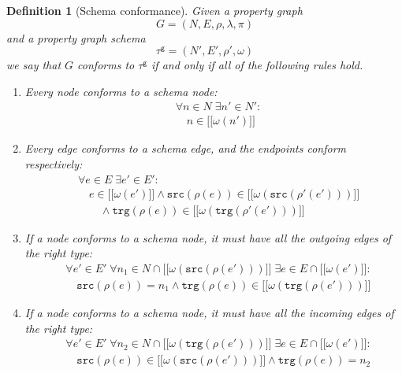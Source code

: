 \documentclass{article}
\newtheorem{definition}[theorem]{Definition}
\newcommand{\src}{\mathtt{src}}
\newcommand{\trg}{\mathtt{trg}}
\newcommand{\gtype}{\tau^\mathsf{g}}
\newcommand{\lsem}{\ensuremath{[\![}}
\newcommand{\rsem}{\ensuremath{]\!]}}
\newcommand{\sem}[1]{\ensuremath{\lsem #1 \rsem}}
\begin{document}
\begin{definition}[Schema conformance]
  Given a property graph $$G = (N, E, \rho, \lambda, \pi)$$ and a property graph schema $$\gtype = (N', E', \rho', \omega)$$ we say that $G$ \emph{conforms} to $\gtype$ if and only if all of the following rules hold.

  \begin{enumerate}
    \item\label{rule:conformance-node}
    Every node conforms to a schema node:
    \begin{align*}
      &\forall n \in N \; \exists n' \in N' :\\
      &\quad n \in \sem{\omega(n')}
    \end{align*}
    
    \item\label{rule:conformance-edge}
    Every edge conforms to a schema edge, and the endpoints conform respectively:
    \begin{align*}
      &\forall e \in E \; \exists e' \in E' :\\
      &\quad e \in \sem{\omega(e')} \wedge \src(\rho(e)) \in \sem{\omega(\src(\rho'(e')))}\\
      &\quad\quad\wedge \trg(\rho(e)) \in \sem{\omega(\trg(\rho'(e')))}
    \end{align*}
    
    \item\label{rule:conformance-out}
    If a node conforms to a schema node, it must have all the outgoing edges of the right type:
    \begin{align*}
      &\forall e' \in E' \; \forall n_1 \in N \cap \sem{\omega(\src(\rho(e')))} \; \exists e \in E \cap \sem{\omega(e')} :\\
      &\quad \src(\rho(e)) = n_1 \wedge \trg(\rho(e)) \in \sem{\omega(\trg(\rho(e')))}
    \end{align*}

    \item\label{rule:conformance-in}
    If a node conforms to a schema node, it must have all the incoming edges of the right type:
    \begin{align*}
      &\forall e' \in E' \; \forall n_2 \in N \cap \sem{\omega(\trg(\rho(e')))} \; \exists e \in E \cap \sem{\omega(e')} :\\
      &\quad \src(\rho(e)) \in \sem{\omega(\src(\rho(e')))} \wedge \trg(\rho(e)) = n_2
    \end{align*}
  \end{enumerate}
\end{definition}
\end{document}
